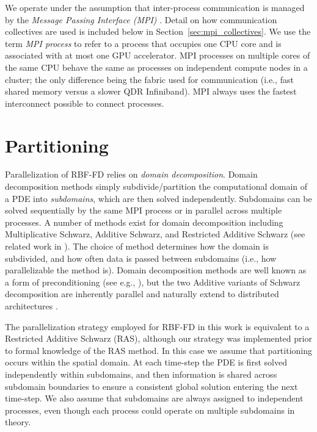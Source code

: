 \documentclass{report}
\begin{document}
We operate under the assumption that inter-process communication is managed by the \emph{Message Passing Interface (MPI)} \cite{MPI}. Detail on how communication collectives are used is included below in Section~\ref{sec:mpi_collectives}. We use the term \emph{MPI process} to refer to a process that occupies one CPU core and is associated with at most one GPU accelerator. MPI processes on multiple cores of the same CPU behave the same as processes on independent compute nodes in a cluster; the only difference being the fabric used for communication (i.e., fast shared memory versus a slower QDR Infiniband). MPI always uses the fastest interconnect possible to connect processes. 


\section{Partitioning}

Parallelization of RBF-FD relies on \emph{domain decomposition}. Domain decomposition methods simply subdivide/partition the computational domain of a PDE into \emph{subdomains}, which are then solved independently. Subdomains can be solved sequentially by the same MPI process or in parallel across multiple processes. A number of methods exist for domain decomposition including Multiplicative Schwarz, Additive Schwarz, and Restricted Additive Schwarz (see related work in \cite{Yokota2010,StCyr2007}). The choice of method determines how the domain is subdivided, and how often data is passed between subdomains (i.e., how parallelizable the method is). Domain decomposition methods are well known as a form of preconditioning (see e.g., \cite{Beatson2000, StCyr2007}), but the two Additive variants of Schwarz decomposition are inherently parallel and naturally extend to distributed architectures \cite{Yokota2010, Gropp1990}. 

The parallelization strategy employed for RBF-FD in this work is equivalent to a Restricted Additive Schwarz (RAS), although our strategy was implemented prior to formal knowledge of the RAS method. In this case we assume that partitioning occurs within the spatial domain. At each time-step the PDE is first solved independently within subdomains, and then information is shared across subdomain boundaries to ensure a consistent global solution entering the next time-step. We also assume that subdomains are always assigned to independent processes, even though each process could operate on multiple subdomains in theory. 
\end{document}
